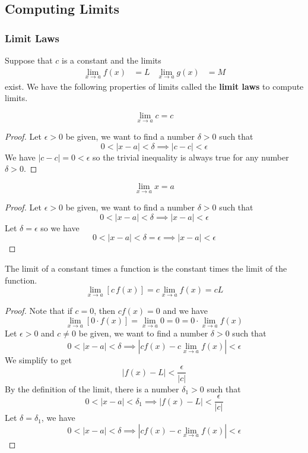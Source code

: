 \subsection{Computing Limits}

\subsubsection{Limit Laws}
Suppose that \(c\) is a constant and the limits
\begin{align*}
    \lim_{x\to a}f(x)&=L&\lim_{x\to a}g(x)&=M
\end{align*}
exist.
We have the following properties of limits called the \textbf{limit laws} to
compute limits.
\begin{theorem}
    \[\lim_{x\to a}c=c\]
\end{theorem}
\begin{proof}
    Let \(\epsilon>0\) be given, we want to find a number \(\delta>0\) such
    that \[0<|x-a|<\delta\implies|c-c|<\epsilon\]
    We have \(|c-c|=0<\epsilon\) so the trivial inequality is always true for
    any number \(\delta>0\).
\end{proof}
\begin{theorem}
    \[\lim_{x\to a}x=a\]
\end{theorem}
\begin{proof}
    Let \(\epsilon>0\) be given, we want to find a number \(\delta>0\) such
    that \[0<|x-a|<\delta\implies|x-a|<\epsilon\]
    Let \(\delta=\epsilon\) so we have
    \[0<|x-a|<\delta=\epsilon\implies|x-a|<\epsilon\]
\end{proof}
\begin{theorem}
    The limit of a constant times a function is the constant times the limit
    of the function.
    \[\lim_{x\to a}[c\,f(x)]=c\lim_{x\to a}f(x)=cL\]
\end{theorem}
\begin{proof}
    Note that if \(c=0\), then \(cf(x)=0\) and we have
    \[\lim_{x\to a}[0\cdot f(x)]=\lim_{x\to a}0=0=0\cdot\lim_{x\to a}f(x)\]
    Let \(\epsilon>0\) and \(c\neq0\) be given, we want to find a number
    \(\delta>0\) such that
    \[0<|x-a|<\delta\implies|cf(x)-c\lim_{x\to a}f(x)|<\epsilon\]
    We simplify to get \[|f(x)-L|<\frac{\epsilon}{|c|}\]
    By the definition of the limit, there is a number \(\delta_1>0\) such that
    \[0<|x-a|<\delta_1\implies|f(x)-L|<\frac{\epsilon}{|c|}\]
    Let \(\delta=\delta_1\), we have \[0<|x-a|<\delta\implies|cf(x)-c\lim_{x\to a}f(x)|<\epsilon\]
\end{proof}
